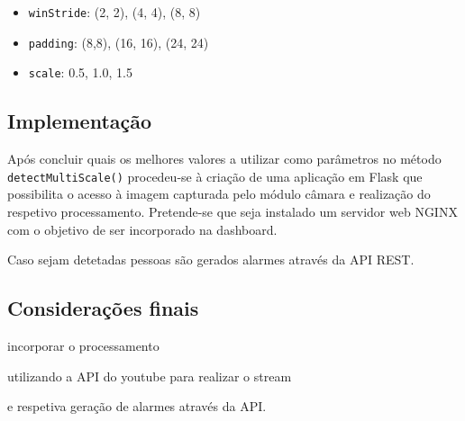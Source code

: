 \begin{itemize}
	\item \texttt{winStride}: (2, 2), (4, 4), (8, 8)
	
	\item \texttt{padding}: (8,8), (16, 16), (24, 24)
	
	\item \texttt{scale}: 0.5, 1.0, 1.5 
\end{itemize}


\subsection{Implementação}


Após concluir quais os melhores valores a utilizar como parâmetros no método \linebreak \texttt{detectMultiScale()}  procedeu-se à criação de uma aplicação em Flask que possibilita o acesso à imagem capturada pelo módulo câmara e realização do respetivo processamento. Pretende-se que seja instalado um servidor web NGINX com o objetivo de ser incorporado na dashboard. 


Caso sejam detetadas pessoas são gerados alarmes através da \ac{API} \ac{REST}. 



\subsection{Considerações finais}





incorporar o processamento 

utilizando a API do youtube para realizar o stream 

e respetiva geração de alarmes através da API.  






